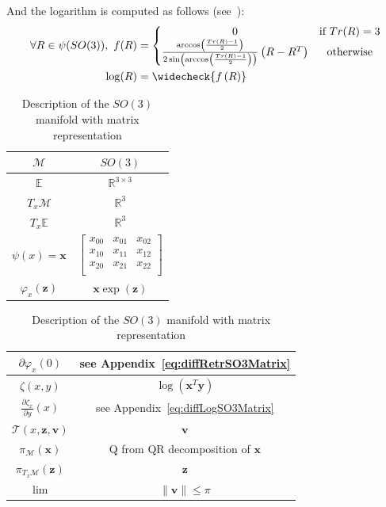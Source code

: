 And the logarithm is computed as follows (see~\cite{merlhiot:thesis:2009}):
\begin{align}
\begin{split}
  \forall R\in\psi(SO(3)),\ f(R) &=
  \left\{ \begin{matrix}
  0 & \text{if }Tr(R) = 3 \\
  \frac{\arccos\left(\frac{Tr(R)-1}{2}\right)}{2\sin\left(\arccos\left(\frac{Tr(R)-1}{2}\right)\right)}\left(R-R^T\right) & \text{otherwise} \\
  \end{matrix} \right.\\
  \log(R) &= \widecheck{f\left(R\right)}
\end{split}
\end{align}

\begin{table} [H]
\caption{Description of the $SO(3)$ manifold with matrix representation}
\centering
\begin{tabular}{cc}
  \toprule
  $\mathcal{M}$ & $SO(3)$ \\
  \midrule
  $\mathbb{E}$ & $\mathbb{R}^{3\times 3}$ \\
  \midrule
  $T_x\mathcal{M}$ & $\mathbb{R}^3$ \\
  \midrule
  $T_x\mathbb{E}$ & $\mathbb{R}^3$ \\
  \midrule
  $\psi(x) = \mathbf{x}$ & $ \begin{bmatrix}
    x_{00} & x_{01} & x_{02} \\
    x_{10} & x_{11} & x_{12} \\
    x_{20} & x_{21} & x_{22} \\
  \end{bmatrix} $ \\
  \midrule
  $\varphi_x(\mathbf{z})$ & $\mathbf{x}\exp(\mathbf{z})$ \\
  \bottomrule
\end{tabular}
\quad
\begin{tabular}{cc}
  \toprule
  $\partial \varphi_x(0)$ & see Appendix~\ref{eq:diffRetrSO3Matrix} \\
  \midrule
  $\zeta(x,y)$ & $\log(\mathbf{x}^T\mathbf{y})$ \\
  \midrule
  $\frac{\partial \zeta_x}{\partial y}(x)$ & see Appendix~\ref{eq:diffLogSO3Matrix} \\
  \midrule
  $\mathcal{T}(x,\mathbf{z}, \mathbf{v})$ & $\mathbf{v}$ \\
  \midrule
  $\pi_\mathcal{M}(\mathbf{x})$ & Q from QR decomposition of $\mathbf{x}$ \\
  \midrule
  $\pi_{T_x\mathcal{M}}(\mathbf{z})$ & $\mathbf{z}$ \\
  \midrule
  $\lim$ & $\|\mathbf{v}\| \leq \pi$ \\
  \bottomrule
\end{tabular}
\end{table}

